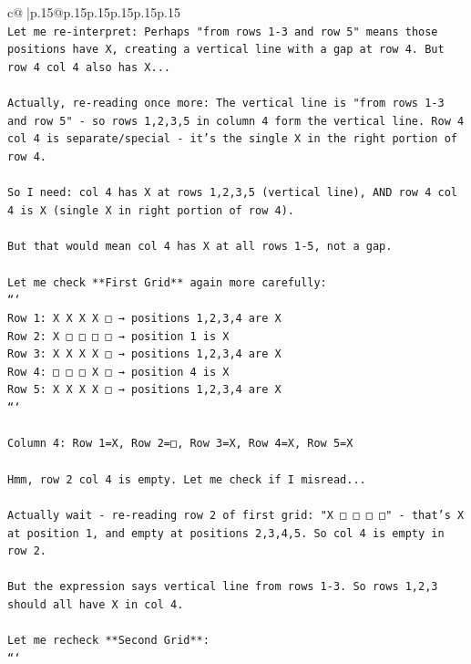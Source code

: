 \documentclass{article}
\begin{document}
{\begin{supertabular}{c@{$\;$}|p{.15\linewidth}@{}p{.15\linewidth}p{.15\linewidth}p{.15\linewidth}p{.15\linewidth}p{.15\linewidth}}
{{{\\ 
\texttt{Let me re{-}interpret: Perhaps "from rows 1{-}3 and row 5" means those positions have X, creating a vertical line with a gap at row 4. But row 4 col 4 also has X...} \\
\\ 
\texttt{Actually, re{-}reading once more: The vertical line is "from rows 1{-}3 and row 5" {-} so rows 1,2,3,5 in column 4 form the vertical line. Row 4 col 4 is separate/special {-} it's the single X in the right portion of row 4.} \\
\\ 
\texttt{So I need: col 4 has X at rows 1,2,3,5 (vertical line), AND row 4 col 4 is X (single X in right portion of row 4).} \\
\\ 
\texttt{But that would mean col 4 has X at all rows 1{-}5, not a gap. } \\
\\ 
\texttt{Let me check **First Grid** again more carefully:} \\
\texttt{```} \\
\texttt{Row 1: X X X X □  → positions 1,2,3,4 are X} \\
\texttt{Row 2: X □ □ □ □  → position 1 is X} \\
\texttt{Row 3: X X X X □  → positions 1,2,3,4 are X} \\
\texttt{Row 4: □ □ □ X □  → position 4 is X} \\
\texttt{Row 5: X X X X □  → positions 1,2,3,4 are X} \\
\texttt{```} \\
\\ 
\texttt{Column 4: Row 1=X, Row 2=□, Row 3=X, Row 4=X, Row 5=X} \\
\\ 
\texttt{Hmm, row 2 col 4 is empty. Let me check if I misread...} \\
\\ 
\texttt{Actually wait {-} re{-}reading row 2 of first grid: "X □ □ □ □" {-} that's X at position 1, and empty at positions 2,3,4,5. So col 4 is empty in row 2.} \\
\\ 
\texttt{But the expression says vertical line from rows 1{-}3. So rows 1,2,3 should all have X in col 4.} \\
\\ 
\texttt{Let me recheck **Second Grid**:} \\
\texttt{```} \\
}}}
\end{supertabular}}
\end{document}
